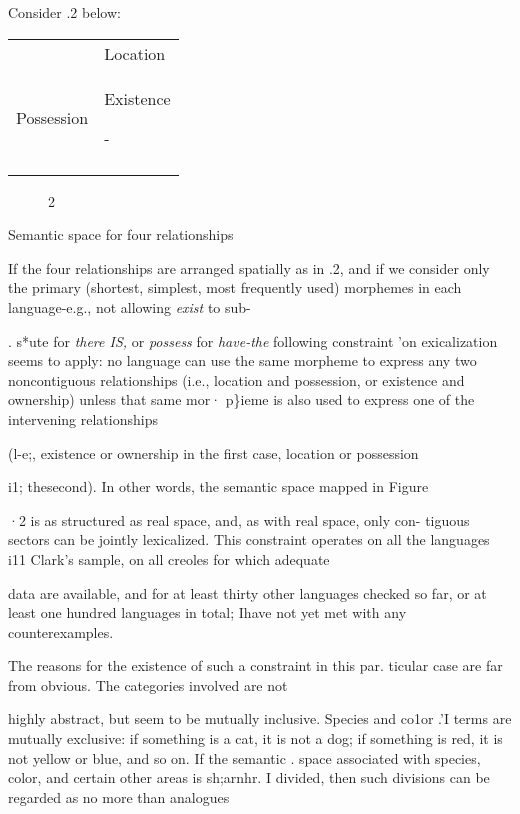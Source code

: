 Consider .2 below:

\begin{tabular}{ll}
\lsptoprule

\multicolumn{1}{l}{Ownership} & Location\\
Possession & Existence

 {}-\\
\lspbottomrule
\end{tabular}
\begin{figure}
\caption{2}
\label{fig:4}
\end{figure}

Semantic space for four relationships

If the four relationships are arranged spatially as in .2, and if we consider only the primary (shortest, simplest, most frequently used) morphemes in each language-e.g., not allowing \textit{exist }to sub-

. s*ute for \textit{there IS, }or \textit{possess }for \textit{have-the }following constraint 'on exicalization seems to apply: no language can use the same mor\-pheme to express any two noncontiguous relationships (i.e., location and possession, or existence and ownership) unless that same mor· p\}ieme is also used to express one of the intervening relationships

(l-e;, existence or ownership in the first case, location or possession

i1; thesecond). In other words, the semantic space mapped in Figure

·2 is as structured as real space, and, as with real space, only con- tiguous sectors can be jointly lexicalized. This constraint operates on all the languages i11 Clark's sample, on all creoles for which adequate


data are available, and for at least thirty other languages checked so far, or at least one hundred languages in total; Ihave not yet met with any counterexamples.

The reasons for the existence of such a constraint in this par. ticular case are far from obvious. The categories involved are not

highly abstract, but seem to be mutually inclusive. Species and co1or .'I terms are mutually exclusive: if something is a cat, it is not a dog; if something is red, it is not yellow or blue, and so on. If the semantic . space associated with species, color, and certain other areas is sh;arnhr. I divided, then such divisions can be regarded as no more than analogues

